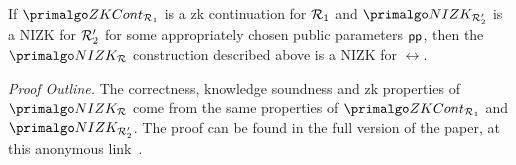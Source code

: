  
\begin{theorem}
	If $\ZKCont_{\relone}$ is a zk continuation for $\mathcal{R}_1$ and $\nizktwo$ is a NIZK for $\mathcal{R}_2'$ for some appropriately chosen public parameters $\mathsf{pp}$, 
	then the $\nizkR$ construction described above is a NIZK for $\rel$.
\end{theorem}

\textit{Proof Outline.} The correctness, knowledge soundness and zk properties of $ \nizkR $ come from the same properties of $ \ZKCont_{\relone} $ and $ \nizktwo $. 
The proof can be found in the full version of the paper, at this anonymous link~\cite{anonymous}.
